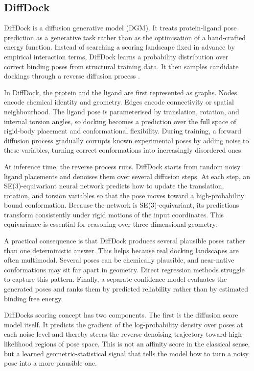 \hypertarget{diffdock-1}{%
\subsection{DiffDock}\label{diffdock-1}}

DiffDock is a diffusion generative model (DGM). It treats protein-ligand pose prediction as a generative task rather than as the optimisation of a hand-crafted energy function. Instead of searching a scoring landscape fixed in advance by empirical interaction terms, DiffDock learns a probability distribution over correct binding poses from structural training data. It then samples candidate dockings through a reverse diffusion process \cite{ref024}.

In DiffDock, the protein and the ligand are first represented as graphs. Nodes encode chemical identity and geometry. Edges encode connectivity or spatial neighbourhood. The ligand pose is parameterised by translation, rotation, and internal torsion angles, so docking becomes a prediction over the full space of rigid-body placement and conformational flexibility. During training, a forward diffusion process gradually corrupts known experimental poses by adding noise to these variables, turning correct conformations into increasingly disordered ones.

At inference time, the reverse process runs. DiffDock starts from random noisy ligand placements and denoises them over several diffusion steps. At each step, an SE(3)-equivariant neural network predicts how to update the translation, rotation, and torsion variables so that the pose moves toward a high-probability bound conformation. Because the network is SE(3)-equivariant, its predictions transform consistently under rigid motions of the input coordinates. This equivariance is essential for reasoning over three-dimensional geometry.

A practical consequence is that DiffDock produces several plausible poses rather than one deterministic answer. This helps because real docking landscapes are often multimodal. Several poses can be chemically plausible, and near-native conformations may sit far apart in geometry. Direct regression methods struggle to capture this pattern. Finally, a separate confidence model evaluates the generated poses and ranks them by predicted reliability rather than by estimated binding free energy.

DiffDock\textquotesingle s scoring concept has two components. The first is the diffusion score model itself. It predicts the gradient of the log-probability density over poses at each noise level and thereby steers the reverse denoising trajectory toward high-likelihood regions of pose space. This is not an affinity score in the classical sense, but a learned geometric-statistical signal that tells the model how to turn a noisy pose into a more plausible one.

